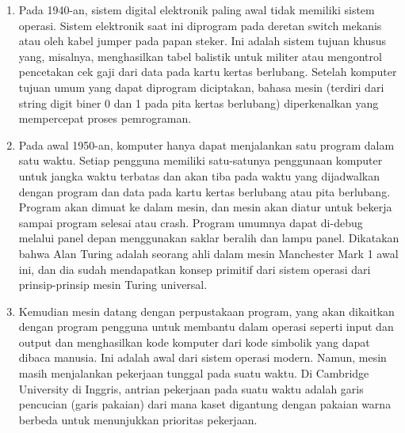 \begin{enumerate}
\item Pada 1940-an, sistem digital elektronik paling awal tidak memiliki sistem operasi. Sistem elektronik saat ini diprogram pada deretan switch mekanis atau oleh kabel jumper pada papan steker. Ini adalah sistem tujuan khusus yang, misalnya, menghasilkan tabel balistik untuk militer atau mengontrol pencetakan cek gaji dari data pada kartu kertas berlubang. Setelah komputer tujuan umum yang dapat diprogram diciptakan, bahasa mesin (terdiri dari string digit biner 0 dan 1 pada pita kertas berlubang) diperkenalkan yang mempercepat proses pemrograman.
		\item Pada awal 1950-an, komputer hanya dapat menjalankan satu program dalam satu waktu. Setiap pengguna memiliki satu-satunya penggunaan komputer untuk jangka waktu terbatas dan akan tiba pada waktu yang dijadwalkan dengan program dan data pada kartu kertas berlubang atau pita berlubang. Program akan dimuat ke dalam mesin, dan mesin akan diatur untuk bekerja sampai program selesai atau crash. Program umumnya dapat di-debug melalui panel depan menggunakan saklar beralih dan lampu panel. Dikatakan bahwa Alan Turing adalah seorang ahli dalam mesin Manchester Mark 1 awal ini, dan dia sudah mendapatkan konsep primitif dari sistem operasi dari prinsip-prinsip mesin Turing universal.
		\item Kemudian mesin datang dengan perpustakaan program, yang akan dikaitkan dengan program pengguna untuk membantu dalam operasi seperti input dan output dan menghasilkan kode komputer dari kode simbolik yang dapat dibaca manusia. Ini adalah awal dari sistem operasi modern. Namun, mesin masih menjalankan pekerjaan tunggal pada suatu waktu. Di Cambridge University di Inggris, antrian pekerjaan pada suatu waktu adalah garis pencucian (garis pakaian) dari mana kaset digantung dengan pakaian warna berbeda untuk menunjukkan prioritas pekerjaan. 
 
	\end{enumerate}
